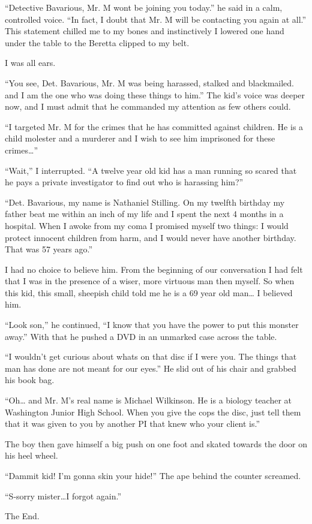 ``Detective Bavarious, Mr. M wont be joining you today.'' he said in
a calm, controlled voice. ``In fact, I doubt that Mr. M will be
contacting you again at all.'' This statement chilled me to my bones
and instinctively I lowered one hand under the table to the Beretta
clipped to my belt.



I was all ears.



``You see, Det. Bavarious, Mr. M was being harassed, stalked and
blackmailed. and I am the one who was doing these things to him.''
The kid's voice was deeper now, and I must admit that he commanded
my attention as few others could.



``I targeted Mr. M for the crimes that he has committed against
children. He is a child molester and a murderer and I wish to see
him imprisoned for these crimes{\ldots}''



``Wait,'' I interrupted. ``A twelve year old kid has a man running so
scared that he pays a private investigator to find out who is
harassing him?''



``Det. Bavarious, my name is Nathaniel Stilling. On my twelfth
birthday my father beat me within an inch of my life and I spent
the next 4 months in a hospital. When I awoke from my coma I
promised myself two things: I would protect innocent children from
harm, and I would never have another birthday. That was 57 years
ago.''



I had no choice to believe him. From the beginning of our
conversation I had felt that I was in the presence of a wiser, more
virtuous man then myself. So when this kid, this small, sheepish
child told me he is a 69 year old man{\ldots} I believed him.



``Look son,'' he continued, ``I know that you have the power to put
this monster away.'' With that he pushed a DVD in an unmarked case
across the table.



``I wouldn't get curious about whats on that disc if I were you. The
things that man has done are not meant for our eyes.'' He slid out
of his chair and grabbed his book bag.



``Oh{\ldots} and Mr. M's real name is Michael Wilkinson. He is a biology
teacher at Washington Junior High School. When you give the cops
the disc, just tell them that it was given to you by another PI
that knew who your client is.''



The boy then gave himself a big push on one foot and skated towards
the door on his heel wheel.



``Dammit kid! I'm gonna skin your hide!'' The ape behind the counter
screamed.



``S-sorry mister{\ldots}I forgot again.''



The End. 
 





